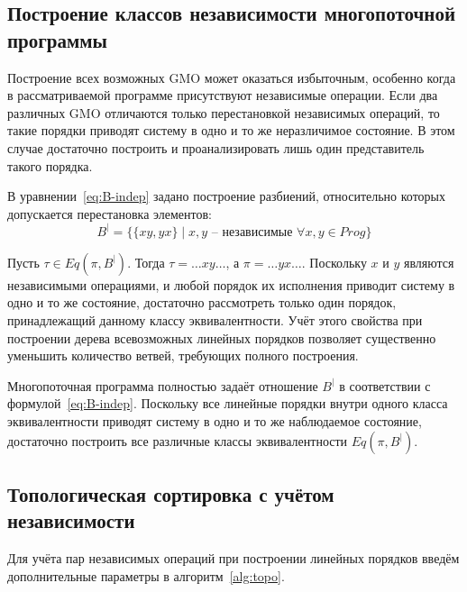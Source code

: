 \subsection{Построение классов независимости многопоточной программы}
\label{sec:ch2/construction-indep}

Построение всех возможных GMO может оказаться избыточным, особенно
когда в рассматриваемой программе присутствуют независимые операции.
Если два различных GMO отличаются только перестановкой независимых
операций, то такие порядки приводят систему в одно и то же
неразличимое состояние. В этом случае достаточно построить и
проанализировать лишь один представитель такого порядка.

В уравнении~\eqref{eq:B-indep} задано построение разбиений,
относительно которых допускается перестановка элементов:
\begin{equation}
  B^| = \{ \{xy, yx\} \mid x, y \text{ -- независимые } \forall x, y \in Prog \}
  \label{eq:B-indep}
\end{equation}

Пусть $\tau \in Eq(\pi, B^|)$. Тогда $\tau = \dots xy \dots$, а $\pi
= \dots yx \dots$. Поскольку $x$ и $y$ являются независимыми
операциями, и любой порядок их исполнения приводит систему в одно и
то же состояние, достаточно рассмотреть только один порядок,
принадлежащий данному классу эквивалентности. Учёт этого свойства при
построении дерева всевозможных линейных порядков позволяет
существенно уменьшить количество ветвей, требующих полного построения.

Многопоточная программа полностью задаёт отношение $B^|$ в
соответствии с формулой~\eqref{eq:B-indep}. Поскольку все линейные
порядки внутри одного класса эквивалентности приводят систему в одно
и то же наблюдаемое состояние, достаточно построить все различные
классы эквивалентности $Eq(\pi, B^|)$.

\subsection{Топологическая сортировка с учётом независимости}
\label{sec:ch2/topo-indep}

Для учёта пар независимых операций при построении линейных порядков
введём дополнительные параметры
в алгоритм~\ref{alg:topo}.

